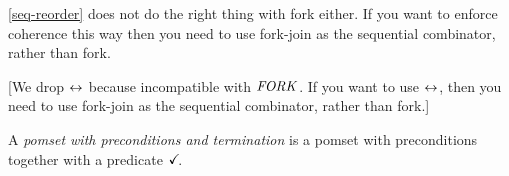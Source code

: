 \eqref{seq-reorder} does not do the right thing with fork either.  If you
want to enforce coherence this way then you need to use fork-join as the
sequential combinator, rather than fork.


[We drop $\mathrel\leftrightarrow$ because incompatible with $\sFORK{}$.  If you want to use
$\mathrel\leftrightarrow$, then you need to use fork-join as the sequential combinator,
rather than fork.]

\begin{definition}
  A \emph{pomset with preconditions and termination} is
  a pomset with preconditions together with a predicate $\checkmark\!$.
\end{definition}





